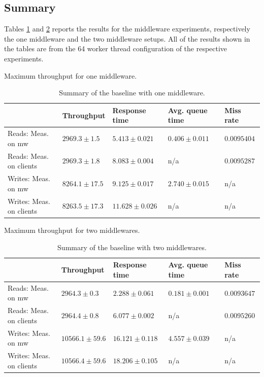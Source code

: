 \documentclass[11pt,a4paper]{article}
\begin{document}
\subsection{Summary} \label{sec:mwb-summary}
Tables \ref{tab:mwb1-summary} and \ref{tab:mwb2-summary} reports the results for the middleware experiments, respectively the one middleware and the two middleware setups. All of the results shown in the tables are from the 64 worker thread configuration of the respective experiments.

\begin{table}[h]
\centering
\small
{Maximum throughput for one middleware.}
\begin{tabular}{|l|p{2.3cm}|p{2.3cm}|p{2.7cm}|p{2.3cm}|}
\hline                       & Throughput        & {\small Response time}      & {\small Avg. queue time} & Miss rate \\ 
\hline Reads: Meas. on mw       & $2969.3 \pm 1.5$  & $5.413 \pm 0.021$  & $0.406 \pm 0.011$  & $0.0095404$ \\ 
\hline Reads: Meas. on clients  & $2969.3 \pm 1.8$  & $8.083 \pm 0.004$  & n/a                & $0.0095287$ \\ 
\hline Writes: Meas. on mw      & $8264.1 \pm 17.5$ & $9.125 \pm 0.017$  & $2.740 \pm 0.015$  & n/a \\ 
\hline Writes: Meas. on clients & $8263.5 \pm 17.3$ & $11.628 \pm 0.026$ & n/a                & n/a \\ 
\hline 
\end{tabular}
\caption{Summary of the baseline with one middleware.} \label{tab:mwb1-summary}
\end{table}
\begin{table}[h]
\centering
\small
{Maximum throughput for two middlewares.}
\begin{tabular}{|l|p{2.3cm}|p{2.3cm}|p{2.7cm}|p{2.3cm}|}
\hline                      & Throughput         & {\small Response time}      & {\small Avg. queue time} & Miss rate \\ 
\hline Reads: Meas. on mw       & $2964.3 \pm 0.3$   & $2.288 \pm 0.061$  & $0.181 \pm 0.001$  & $0.0093647$ \\ 
\hline Reads: Meas. on clients  & $2964.4 \pm 0.8$   & $6.077 \pm 0.002$  & n/a                & $0.0095260$ \\ 
\hline Writes: Meas. on mw      & $10566.1 \pm 59.6$ & $16.121 \pm 0.118$ & $4.557 \pm 0.039$  & n/a     \\ 
\hline Writes: Meas. on clients & $10566.4 \pm 59.6$ & $18.206 \pm 0.105$ & n/a                & n/a     \\ 
\hline 
\end{tabular}
\caption{Summary of the baseline with two middlewares.} \label{tab:mwb2-summary}
\end{table}
\end{document}
